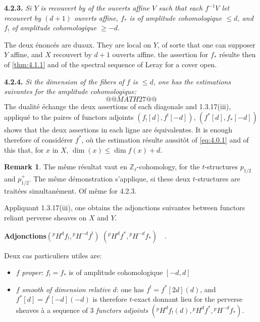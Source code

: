 \documentclass[12pt,a4paper]{article}
\theoremstyle{plain}
\theoremstyle{definition}
\newtheorem{remark}[theorem]{Remark}
\begin{document}
\noindent\textbf{4.2.3.} \emph{Si $Y$ is recouvert by of the ouverts affine $V$ such that each $f^{-1}V$ let recouvert by $(d+1)$ ouverts affine, $f_{*}$ is of amplitude cohomologique $\leq d$, and $f_{!}$ of amplitude cohomologique $\geq -d$.}

The deux \'{e}nonc\'{e}s are duaux. They are local on $Y$, of sorte that one can supposer $Y$ affine, and $X$ recouvert by $d+1$ ouverts affine. the assertion for $f_{*}$ r\'{e}sulte then of \ref{thm:4.1.1} and of the spectral sequence of Leray for a cover open.

\noindent\textbf{4.2.4.} \emph{Si the dimension of the fibers of $f$ is $\leq d$, one has the estimations suivantes for the amplitude cohomologique:}
\[
@@MATH27@@
\]
The dualit\'{e} \'{e}change the deux assertions of each diagonale and 1.3.17(iii), appliqu\'{e} to the paires of functors adjoints $(f_{!}[d], f^{!}[-d])$, $(f^{*}[d], f_{*}[-d])$ shows that the deux assertions in each ligne are \'{e}quivalentes. It is enough therefore of consid\'{e}rer $f^{*}$, o\`{u} the estimation r\'{e}sulte aussit\^{o}t of \eqref{eq:4.0.1} and of this that, for $x$ in $X$, $\dim(x) \leq \dim f(x) + d$.

\begin{remark}
The m\^{e}me r\'{e}sultat vaut en $\mathbb{Z}_{\ell}$-cohomology, for the $t$-structures $p_{1/2}$ and $p_{1/2}^{+}$. The m\^{e}me d\'{e}monstration s'applique, si these deux $t$-structures are trait\'{e}es simultan\'{e}ment. Of m\^{e}me for 4.2.3.
\end{remark}

Appliquant 1.3.17(iii), one obtains the adjonctions suivantes between functors reliant perverse sheaves on $X$ and $Y$.
\begin{center}
\textbf{Adjonctions}\qquad $({}^{p}H^{d}f_{!}, {}^{p}H^{-d}f^{!})$ \quad {} \quad $({}^{p}H^{d}f^{*}, {}^{p}H^{-d}f_{*})\quad.$
\end{center}
Deux cas particuliers utiles are:
\begin{itemize}
\item $f$ \emph{proper}: $f_{!} = f_{*}$ is of amplitude cohomologique $[-d,d]$
\item $f$ \emph{smooth of dimension relative} $d$: one has $f^{!} = f^{*}[2d](d)$, and $f^{*}[d] = f^{!}[-d](-d)$ is therefore $t$-exact donnant lieu for the perverse sheaves \`{a} a sequence of 3 \emph{functors adjoints} $({}^{p}H^{d}f_{!}(d), {}^{p}H^{d}f^{*}, {}^{p}H^{-d}f_{*})$.
\end{itemize}
\end{document}
